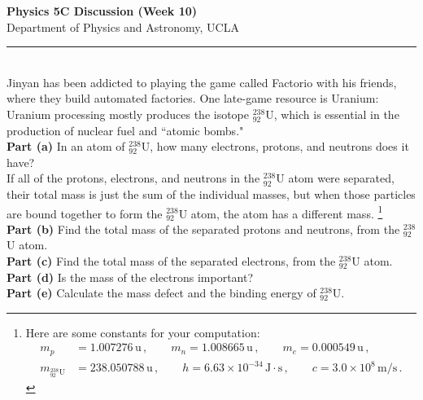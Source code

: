 \documentclass[11pt]{article}
\begin{document}
\Large \noindent \textbf{Physics 5C Discussion (Week 10)}\\
\normalsize
Department of Physics and Astronomy, UCLA\\
\noindent\rule{8cm}{0.4pt}\\
Jinyan has been addicted to playing the game called Factorio with his friends, where they build automated factories. One late-game resource is Uranium: Uranium processing mostly produces the isotope ${}_{92}^{238}$U, which is essential in the production of nuclear fuel and ``atomic bombs."\\

\noindent \textbf{Part (a)} In an atom of $_{92}^{238}$U, how many electrons, protons, and neutrons does it have?\\

\noindent If all of the protons, electrons, and neutrons in the $_{92}^{238}$U atom were separated, their total mass is just the sum of the individual masses, but when those particles are bound together to form the $_{92}^{238}$U atom, the atom has a different mass. \footnote{Here are some constants for your computation:
\begin{align*}
m_p &= 1.007276\,\text{u}\,,\qquad
m_n = 1.008665\,\text{u}\,,\qquad
m_e = 0.000549\,\text{u}\,,\\
m_{{}^{238}_{92}\text{U}} &= 238.050788\,\text{u}\,,\qquad
h = 6.63\times 10^{-34}\,\text{J}\cdot\text{s}\,,\qquad
c = 3.0\times 10^8\,\text{m/s}\,.
\end{align*}}\\

\noindent \textbf{Part (b)} Find the total mass of the separated protons and neutrons, from the $_{92}^{238}$U atom.\\

\noindent \textbf{Part (c)} Find the total mass of the separated electrons, from the $_{92}^{238}$U atom.\\

\noindent \textbf{Part (d)} Is the mass of the electrons important?\\

\noindent \textbf{Part (e)} Calculate the mass defect and the binding energy of $_{92}^{238}$U.\\
\vfill
\end{document}
